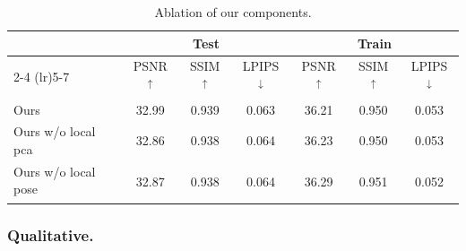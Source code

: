 \documentclass[runningheads]{llncs}
\begin{document}
\begin{table}[tb]
    \centering
    \small
    \caption{Ablation of our components.}
    \setlength{\tabcolsep}{3pt}
\begin{tabular}{lcccccc}
 & \multicolumn{3}{c}{Test} & \multicolumn{3}{c}{Train} \\
 \cmidrule(lr){2-4} \cmidrule(lr){5-7}
 & PSNR\textsuperscript{$\uparrow$} & SSIM\textsuperscript{$\uparrow$} & LPIPS\textsuperscript{$\downarrow$} & PSNR\textsuperscript{$\uparrow$} & SSIM\textsuperscript{$\uparrow$} & LPIPS\textsuperscript{$\downarrow$} \\ \hline
Ours & \cellcolor{best!40}32.99 & \cellcolor{best!40}0.939 & \cellcolor{best!40}0.063 & \cellcolor{best!00}36.21 & \cellcolor{best!00}0.950 & \cellcolor{best!00}0.053 \\
Ours w/o local pca & \cellcolor{best!00}32.86 & \cellcolor{best!00}0.938 & \cellcolor{best!00}0.064 & \cellcolor{best!15}36.23 & \cellcolor{best!15}0.950 & \cellcolor{best!15}0.053 \\
Ours w/o local pose\textsubscript{\phantom{$\downarrow$}} & \cellcolor{best!15}32.87 & \cellcolor{best!15}0.938 & \cellcolor{best!15}0.064 & \cellcolor{best!40}36.29 & \cellcolor{best!40}0.951 & \cellcolor{best!40}0.052 \\
\end{tabular}
    \label{tab:results_ablation}
\end{table}



\subsubsection{Qualitative.}
\end{document}
